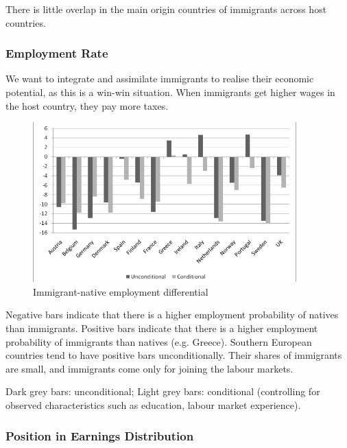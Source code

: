            There is little overlap in the main origin countries of immigrants across host countries.

        \subsubsection{Employment Rate}
        
            We want to integrate and assimilate immigrants to realise their economic potential, as this is a win-win situation. When immigrants get higher wages in the host country, they pay more taxes.
            
            \begin{figure}[H]
                \centering
                \includegraphics[width=4in]{images/ch11/7.png}
                \caption{Immigrant-native employment differential}
            \end{figure}

            Negative bars indicate that there is a higher employment probability of natives than immigrants. Positive bars indicate that there is a higher employment probability of immigrants than natives (e.g. Greece). Southern European countries tend to have positive bars unconditionally. Their shares of immigrants are small, and immigrants come only for joining the labour markets.
            
            Dark grey bars: unconditional; Light grey bars: conditional (controlling for observed characteristics such as education, labour market experience).

        \subsubsection{Position in Earnings Distribution}

